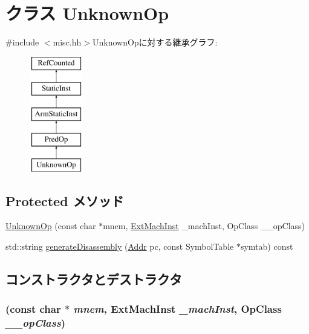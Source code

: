\hypertarget{classUnknownOp}{
\section{クラス UnknownOp}
\label{classUnknownOp}
}


{\ttfamily \#include $<$misc.hh$>$}UnknownOpに対する継承グラフ:\begin{figure}[H]
\begin{center}
\leavevmode
\includegraphics[height=5cm]{classUnknownOp}
\end{center}
\end{figure}
\subsection*{Protected メソッド}
\begin{DoxyCompactItemize}
\item 
\hyperlink{classUnknownOp_ac417d3ae39649e144011ef74b6a20b43}{UnknownOp} (const char $\ast$mnem, \hyperlink{classStaticInst_a5605d4fc727eae9e595325c90c0ec108}{ExtMachInst} \_\-machInst, OpClass \_\-\_\-opClass)
\item 
std::string \hyperlink{classUnknownOp_a95d323a22a5f07e14d6b4c9385a91896}{generateDisassembly} (\hyperlink{classm5_1_1params_1_1Addr}{Addr} pc, const SymbolTable $\ast$symtab) const 
\end{DoxyCompactItemize}


\subsection{コンストラクタとデストラクタ}
\hypertarget{classUnknownOp_ac417d3ae39649e144011ef74b6a20b43}{
\subsubsection[{UnknownOp}]{ (const char $\ast$ {\em mnem}, \/  {\bf ExtMachInst} {\em \_\-machInst}, \/  OpClass {\em \_\-\_\-opClass})}}
\label{classUnknownOp_ac417d3ae39649e144011ef74b6a20b43}



